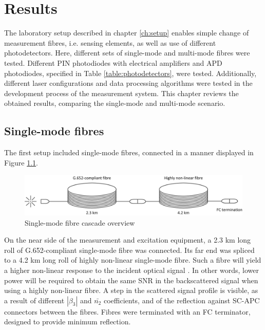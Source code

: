 \documentclass{standalone}
\begin{document}
\chapter{Results} \label{ch:results}
\setcounter{page}\thestranica


The laboratory setup described in chapter \ref{ch:setup} enables simple change of measurement fibres, i.e. sensing elements, as well as use of different photodetectors. Here, different sets of single-mode and multi-mode fibres were tested. Different PIN photodiodes with electrical amplifiers and APD photodiodes, specified in Table \ref{table:photodetectors}, were tested. Additionally, different laser configurations and data processing algorithms were tested in the development process of the measurement system. This chapter reviews the obtained results, comparing the single-mode and multi-mode scenario.

\section{Single-mode fibres}

The first setup included single-mode fibres, connected in a manner displayed in Figure \ref{fig:smf_cascade}.
\begin{figure}[h]
	\centering
	\includegraphics[width=\textwidth]{smf_cascade.png}
	\caption{Single-mode fibre cascade overview}
	\label{fig:smf_cascade}
\end{figure}
On the near side of the measurement and excitation equipment, a 2.3 km long roll of G.652-compliant single-mode fibre was connected. Its far end was spliced to a 4.2 km long roll of highly non-linear single-mode fibre. Such a fibre will yield a higher non-linear response to the incident optical signal \cite{Hiroishi2003}. In other words, lower power will be required to obtain the same SNR in the backscattered signal when using a highly non-linear fibre. A step in the scattered signal profile is visible, as a result of different $\left|\beta_3\right|$ and $\bar{n_2}$ coefficients, and of the reflection against SC-APC connectors between the fibres. Fibres were terminated with an FC terminator, designed to provide minimum reflection. \\
\end{document}
